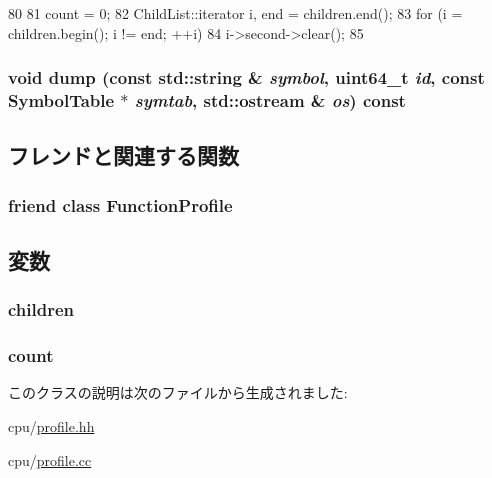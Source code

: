 \begin{DoxyCode}
80 {
81     count = 0;
82     ChildList::iterator i, end = children.end();
83     for (i = children.begin(); i != end; ++i)
84         i->second->clear();
85 }
\end{DoxyCode}
\hypertarget{classProfileNode_a3d5d4b4793cd7d5d9b562dc9d44e9d95}{
\subsubsection[{dump}]{\setlength{\rightskip}{0pt plus 5cm}void dump (const std::string \& {\em symbol}, \/  uint64\_\-t {\em id}, \/  const {\bf SymbolTable} $\ast$ {\em symtab}, \/  std::ostream \& {\em os}) const}}
\label{classProfileNode_a3d5d4b4793cd7d5d9b562dc9d44e9d95}


\subsection{フレンドと関連する関数}
\hypertarget{classProfileNode_a3bca6eafa41585553190654e4128751e}{
\subsubsection[{FunctionProfile}]{\setlength{\rightskip}{0pt plus 5cm}friend class {\bf FunctionProfile}}}
\label{classProfileNode_a3bca6eafa41585553190654e4128751e}


\subsection{変数}
\hypertarget{classProfileNode_aa8705eb9f16550f41bad1af0a206f1f1}{
\subsubsection[{children}]{ {\bf children}}}
\label{classProfileNode_aa8705eb9f16550f41bad1af0a206f1f1}
\hypertarget{classProfileNode_a265c4451f4ac22dababe512194d09939}{
\subsubsection[{count}]{ {\bf count}}}
\label{classProfileNode_a265c4451f4ac22dababe512194d09939}


このクラスの説明は次のファイルから生成されました:\begin{DoxyCompactItemize}
\item 
cpu/\hyperlink{profile_8hh}{profile.hh}\item 
cpu/\hyperlink{profile_8cc}{profile.cc}\end{DoxyCompactItemize}
